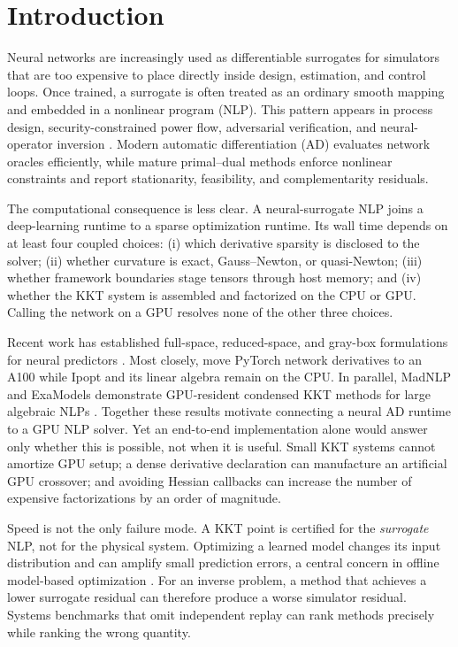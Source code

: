 \section{Introduction}
\label{sec:introduction}

Neural networks are increasingly used as differentiable surrogates for
simulators that are too expensive to place directly inside design, estimation,
and control loops.  Once trained, a surrogate is often treated as an ordinary
smooth mapping and embedded in a nonlinear program (NLP).  This pattern appears
in process design, security-constrained power flow, adversarial verification,
and neural-operator inversion
\citep{yang2021modeling,kilwein2023feasibility,bugosen2023flowsheet,li2021fno}.
Modern automatic differentiation (AD) evaluates network
oracles efficiently, while mature primal--dual methods enforce nonlinear
constraints and report stationarity, feasibility, and complementarity
residuals.

The computational consequence is less clear.  A neural-surrogate NLP joins a
deep-learning runtime to a sparse optimization runtime.  Its wall time depends
on at least four coupled choices: (i) which derivative sparsity is disclosed to
the solver; (ii) whether curvature is exact, Gauss--Newton, or quasi-Newton;
(iii) whether framework boundaries stage tensors through host memory; and
(iv) whether the KKT system is assembled and factorized on the CPU or GPU.
Calling the network on a GPU resolves none of the other three choices.

Recent work has established full-space, reduced-space, and gray-box
formulations for neural predictors \citep{ceccon2022omlt,dowson2025mathoptai,
parker2024formulations}.  Most closely, \citet{parker2025gpu} move PyTorch
network derivatives to an A100 while Ipopt and its linear algebra remain on the
CPU.  In parallel, MadNLP and ExaModels demonstrate GPU-resident condensed KKT
methods for large algebraic NLPs
\citep{shin2024opf,pacaud2024dynamic,pacaud2024condensed}.  Together these
results motivate connecting a neural AD runtime to a GPU NLP solver.  Yet an end-to-end
implementation alone would answer only whether this is possible, not when it
is useful.  Small KKT systems cannot amortize GPU setup; a dense derivative
declaration can manufacture an artificial GPU crossover; and avoiding Hessian
callbacks can increase the number of expensive factorizations by an order of
magnitude.

Speed is not the only failure mode.  A KKT point is certified for
the \emph{surrogate} NLP, not for the physical system.  Optimizing a learned
model changes its input distribution and can amplify small prediction errors,
a central concern in offline model-based optimization
\citep{trabucco2021coms,trabucco2022designbench}.  For an inverse problem, a
method that achieves a lower surrogate residual can therefore produce a worse
simulator residual.  Systems benchmarks that omit independent replay can rank
methods precisely while ranking the wrong quantity.

